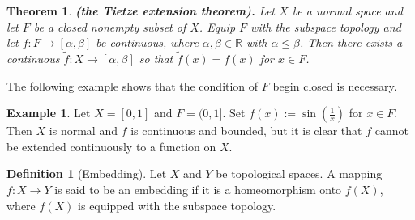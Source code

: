 \documentclass[11pt,a4paper]{article}
\theoremstyle{definition}
\newtheorem{definition}{Definition}[section]
\newtheorem{example}{Example}[section]
\theoremstyle{plain}
\newtheorem{theorem}{Theorem}[section]
\newcommand{\R}{\mathbb{R}}
\renewcommand{\tt}[1]{\textnormal{\textbf{(#1).}}} %
\begin{document}
  \begin{theorem}\tt{the Tietze extension theorem}
    Let $X$ be a normal space and let $F$ be a closed nonempty subset of $X$.
    Equip $F$ with the subspace topology
    and let $f \colon F \to [\alpha, \beta]$ be continuous,
    where $\alpha, \beta \in \R$ with $\alpha \le \beta$.
    Then there exists a continuous $\tilde{f} \colon X \to [\alpha, \beta]$
    so that $\tilde{f}(x) = f(x)$ for $x \in F$.
  \end{theorem}
  
  The following example shows that the condition of $F$ begin closed is
  necessary.

  \begin{example}
    Let $X = [0,1]$ and $F = (0,1]$.
    Set $f(x) := \sin\left(\frac {1}{x}\right)$ for $x \in F$.
    Then $X$ is normal and $f$ is continuous and bounded, but it is clear
    that $f$ cannot be extended continuously to a function on $X$.
  \end{example}

  \begin{definition}[Embedding]
      Let $X$ and $Y$ be topological spaces. A mapping $f \colon X \to Y$
      is said to be an embedding if it is a homeomorphism onto $f(X)$,
      where $f(X)$ is equipped with the subspace topology.
  \end{definition}
  
  
\end{document}
